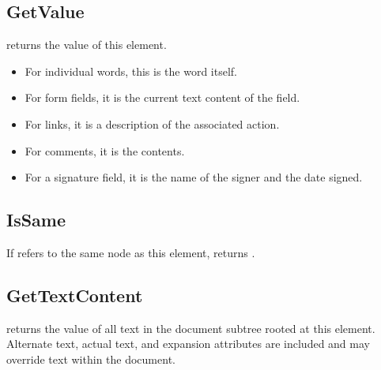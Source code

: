 \documentclass[letterpaper,12pt,english,openany,oneside]{sphinxmanual}
\begin{document}
\subsection{GetValue}
\label{\detokenize{Access_DOM:getvalue}}
 returns the value of this element.
\begin{itemize}
\item {} 
For individual words, this is the word itself.

\item {} 
For form fields, it is the current text content of the field.

\item {} 
For links, it is a description of the associated action.

\item {} 
For comments, it is the contents.

\item {} 
For a signature field, it is the name of the signer and the date signed.

\end{itemize}

\begin{sphinxVerbatim}[commandchars=\\\{\}]
   
\end{sphinxVerbatim}


\subsection{IsSame}
\label{\detokenize{Access_DOM:issame}}
If  refers to the same node as this element,  returns  .

\begin{sphinxVerbatim}[commandchars=\\\{\}]
      
\end{sphinxVerbatim}


\subsection{GetTextContent}
\label{\detokenize{Access_DOM:gettextcontent}}
 returns the value of all text in the document subtree rooted at this element. Alternate text, actual text, and expansion attributes are included and may override text within the document.
\end{document}
